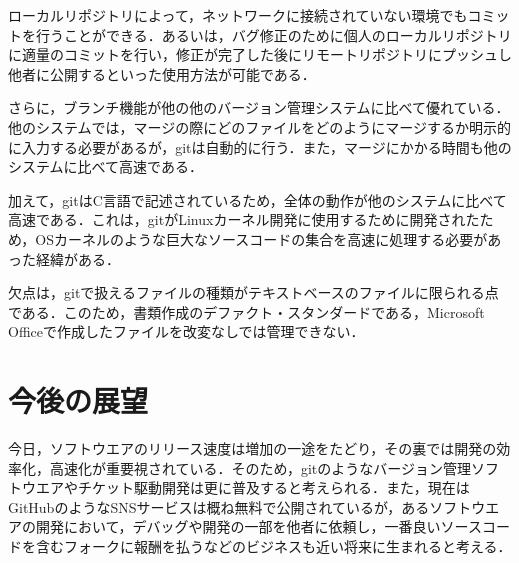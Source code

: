 \documentclass[a4paper,9pt,twocolumn]{jsarticle}
\begin{document}
ローカルリポジトリによって，ネットワークに接続されていない環境でもコミットを行うことができる．あるいは，バグ修正のために個人のローカルリポジトリに適量のコミットを行い，修正が完了した後にリモートリポジトリにプッシュし他者に公開するといった使用方法が可能である．

さらに，ブランチ機能が他の他のバージョン管理システムに比べて優れている．他のシステムでは，マージの際にどのファイルをどのようにマージするか明示的に入力する必要があるが，gitは自動的に行う．また，マージにかかる時間も他のシステムに比べて高速である．

加えて，gitはC言語で記述されているため，全体の動作が他のシステムに比べて高速である．これは，gitがLinuxカーネル開発に使用するために開発されたため，OSカーネルのような巨大なソースコードの集合を高速に処理する必要があった経緯がある．

欠点は，gitで扱えるファイルの種類がテキストベースのファイルに限られる点である．このため，書類作成のデファクト・スタンダードである，Microsoft Officeで作成したファイルを改変なしでは管理できない．

\section{今後の展望}
今日，ソフトウエアのリリース速度は増加の一途をたどり，その裏では開発の効率化，高速化が重要視されている．そのため，gitのようなバージョン管理ソフトウエアやチケット駆動開発は更に普及すると考えられる．また，現在はGitHubのようなSNSサービスは概ね無料で公開されているが，あるソフトウエアの開発において，デバッグや開発の一部を他者に依頼し，一番良いソースコードを含むフォークに報酬を払うなどのビジネスも近い将来に生まれると考える．

\small
\begin{thebibliography}{99}

\end{thebibliography}
\end{document}

